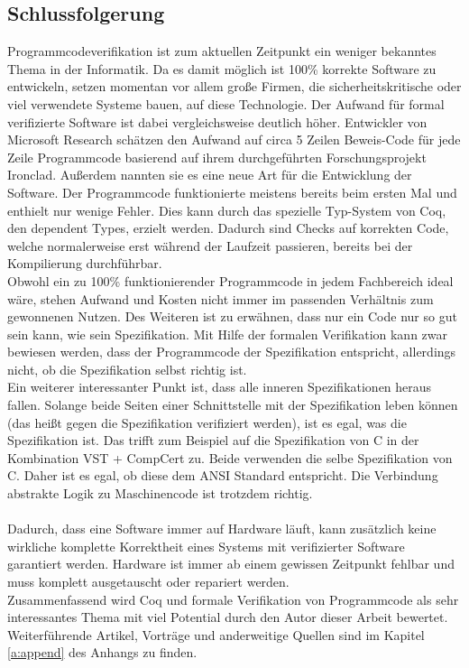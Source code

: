 \subsection{Schlussfolgerung}

Programmcodeverifikation ist zum aktuellen Zeitpunkt ein weniger bekanntes Thema in der Informatik. Da es damit möglich ist 100\% korrekte Software zu entwickeln, setzen momentan vor allem große Firmen, die sicherheitskritische oder viel verwendete Systeme bauen, auf diese Technologie. Der Aufwand für formal verifizierte Software ist dabei vergleichsweise deutlich höher. Entwickler von Microsoft Research schätzen den Aufwand auf circa 5 Zeilen Beweis-Code für jede Zeile Programmcode basierend auf ihrem durchgeführten Forschungsprojekt Ironclad. Außerdem nannten sie es eine neue Art für die Entwicklung der Software. Der Programmcode funktionierte meistens bereits beim ersten Mal und enthielt nur wenige Fehler.\cite{IRONCLAD01:FV} Dies kann durch das spezielle Typ-System von Coq, den dependent Types, erzielt werden. Dadurch sind Checks auf korrekten Code, welche normalerweise erst während der Laufzeit passieren, bereits bei der Kompilierung durchführbar.\\
Obwohl ein zu 100\% funktionierender Programmcode in jedem Fachbereich ideal wäre, stehen Aufwand und Kosten nicht immer im passenden Verhältnis zum gewonnenen Nutzen.
Des Weiteren ist zu erwähnen, dass nur ein Code nur so gut sein kann, wie sein Spezifikation. Mit Hilfe der formalen Verifikation kann zwar bewiesen werden, dass der Programmcode der Spezifikation entspricht, allerdings nicht, ob die Spezifikation selbst richtig ist.\\
Ein  weiterer interessanter Punkt ist, dass alle inneren Spezifikationen heraus fallen. Solange beide Seiten einer Schnittstelle mit der Spezifikation leben können (das heißt gegen die Spezifikation verifiziert werden), ist es egal, was die Spezifikation ist. Das trifft zum Beispiel auf die Spezifikation von C in der Kombination VST + CompCert zu. Beide verwenden die selbe Spezifikation von C. Daher ist es egal, ob diese dem ANSI Standard entspricht. Die Verbindung abstrakte Logik zu Maschinencode ist trotzdem richtig.\\
\\
Dadurch, dass eine Software immer auf Hardware läuft, kann zusätzlich keine wirkliche komplette Korrektheit eines Systems mit verifizierter Software garantiert werden. Hardware ist immer ab einem gewissen Zeitpunkt fehlbar und muss komplett ausgetauscht oder repariert werden.\\
Zusammenfassend wird Coq und formale Verifikation von Programmcode als sehr interessantes Thema mit viel Potential durch den Autor dieser Arbeit bewertet. Weiterführende Artikel, Vorträge und anderweitige Quellen sind im Kapitel \ref{a:append} des Anhangs zu finden. 


